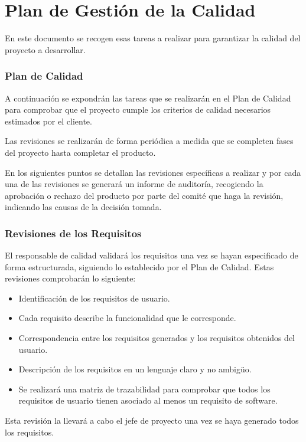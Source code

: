 \section{Plan de Gestión de la Calidad} \label{sec:calidad}
\par En este documento se recogen esas tareas a realizar para garantizar la calidad del proyecto a desarrollar. 

\subsubsection{Plan de Calidad}
\par A continuación se expondrán las tareas que se realizarán en el Plan de Calidad para comprobar que el proyecto cumple los criterios de calidad necesarios estimados por el cliente.

Las revisiones se realizarán de forma periódica a medida que se completen fases del proyecto hasta completar el producto.

En los siguientes puntos se detallan las revisiones específicas a realizar y por cada una de las revisiones se generará un informe de auditoría, recogiendo la aprobación o rechazo del producto por parte del comité que haga la revisión, indicando las causas de la decisión tomada.

\subsubsection{Revisiones de los Requisitos}
\par El responsable de calidad validará los requisitos una vez se hayan especificado de forma estructurada, siguiendo lo establecido por el Plan de Calidad. Estas revisiones comprobarán lo siguiente:
\begin{itemize}[-]
  \item Identificación de los requisitos de usuario.
  \item Cada requisito describe la funcionalidad que le corresponde.
  \item Correspondencia entre los requisitos generados y los requisitos obtenidos del usuario.
  \item Descripción de los requisitos en un lenguaje claro y no ambigüo.
  \item Se realizará una matriz de trazabilidad para comprobar que todos los requisitos de usuario tienen asociado al menos un requisito de software.
\end{itemize}
\par Esta revisión la llevará a cabo el jefe de proyecto una vez se haya generado todos los requisitos.

